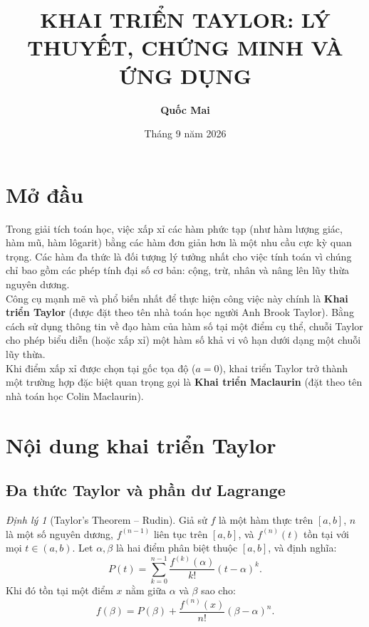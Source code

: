 \documentclass[12pt]{article}
\title{\textbf{KHAI TRIỂN TAYLOR: LÝ THUYẾT, CHỨNG MINH VÀ ỨNG DỤNG}}
\author{\textbf{Quốc Mai}}
\date{Tháng 9 năm 2026}
\theoremstyle{definition}
\theoremstyle{remark}
\newtheorem{theorem}{Định lý}
\begin{document}
\maketitle

\section{Mở đầu}

Trong giải tích toán học, việc xấp xỉ các hàm phức tạp (như hàm lượng giác, hàm mũ, hàm lôgarit) bằng các hàm đơn giản hơn là một nhu cầu cực kỳ quan trọng. Các hàm đa thức là đối tượng lý tưởng nhất cho việc tính toán vì chúng chỉ bao gồm các phép tính đại số cơ bản: cộng, trừ, nhân và nâng lên lũy thừa nguyên dương.\\
Công cụ mạnh mẽ và phổ biến nhất để thực hiện công việc này chính là \textbf{Khai triển Taylor} (được đặt theo tên nhà toán học người Anh Brook Taylor). Bằng cách sử dụng thông tin về đạo hàm của hàm số tại một điểm cụ thể, chuỗi Taylor cho phép biểu diễn (hoặc xấp xỉ) một hàm số khả vi vô hạn dưới dạng một chuỗi lũy thừa.\\
Khi điểm xấp xỉ được chọn tại gốc tọa độ ($a = 0$), khai triển Taylor trở thành một trường hợp đặc biệt quan trọng gọi là \textbf{Khai triển Maclaurin} (đặt theo tên nhà toán học Colin Maclaurin).
\section{Nội dung khai triển Taylor}
\subsection{Đa thức Taylor và phần dư Lagrange}
\begin{theorem}[Taylor's Theorem -- Rudin]
Giả sử $f$ là một hàm thực trên $[a, b]$, $n$ là một số nguyên dương, $f^{(n-1)}$ liên tục trên $[a, b]$, và $f^{(n)}(t)$ tồn tại với mọi $t \in (a, b)$. Let $\alpha, \beta$ là hai điểm phân biệt thuộc $[a, b]$, và định nghĩa:
\begin{equation}
P(t) = \sum_{k=0}^{n-1} \frac{f^{(k)}(\alpha)}{k!} (t - \alpha)^k.
\end{equation}
Khi đó tồn tại một điểm $x$ nằm giữa $\alpha$ và $\beta$ sao cho:
\begin{equation}
f(\beta) = P(\beta) + \frac{f^{(n)}(x)}{n!} (\beta - \alpha)^n.
\end{equation}
\end{theorem}
\end{document}
